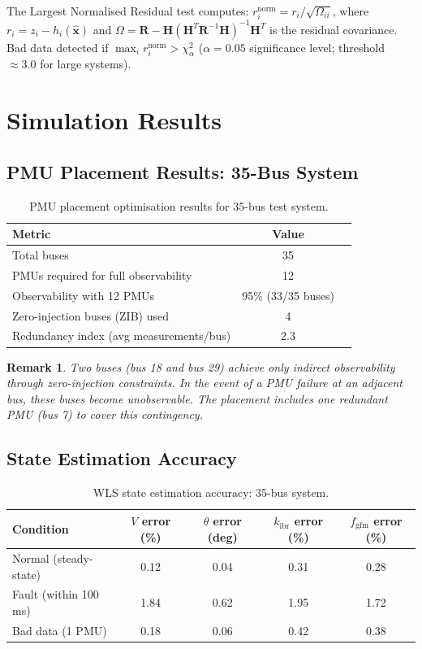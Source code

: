\documentclass[11pt, a4paper]{article}
\newcommand{\kibr}{k_{\mathrm{ibr}}}
\newcommand{\fgfm}{f_{\mathrm{gfm}}}
\newtheorem{remark}{Remark}
\begin{document}
The Largest Normalised Residual test computes:
$r_i^{\mathrm{norm}} = r_i / \sqrt{\Omega_{ii}}$,
where $r_i = z_i - h_i(\hat{\mathbf{x}})$ and
$\Omega = \mathbf{R} - \mathbf{H}(\mathbf{H}^T\mathbf{R}^{-1}\mathbf{H})^{-1}\mathbf{H}^T$
is the residual covariance.
Bad data detected if $\max_i r_i^{\mathrm{norm}} > \chi^2_{\alpha}$
($\alpha = 0.05$ significance level; threshold $\approx 3.0$ for large systems).

\section{Simulation Results}
\label{sec:results}

\subsection{PMU Placement Results: 35-Bus System}

\begin{table}[ht]
\centering
\caption{PMU placement optimisation results for 35-bus test system.}
\label{tab:pmu}
\begin{tabular}{lcc}
\toprule
Metric & Value \\
\midrule
Total buses & 35 \\
PMUs required for full observability & 12 \\
Observability with 12 PMUs & 95\% (33/35 buses) \\
Zero-injection buses (ZIB) used & 4 \\
Redundancy index (avg measurements/bus) & 2.3 \\
\bottomrule
\end{tabular}
\end{table}

\begin{remark}
Two buses (bus 18 and bus 29) achieve only indirect observability through
zero-injection constraints. In the event of a PMU failure at an adjacent bus,
these buses become unobservable. The placement includes one redundant PMU
(bus 7) to cover this contingency.
\end{remark}

\subsection{State Estimation Accuracy}

\begin{table}[ht]
\centering
\caption{WLS state estimation accuracy: 35-bus system.}
\label{tab:accuracy}
\begin{tabular}{lcccc}
\toprule
Condition & $V$ error (\%) & $\theta$ error (deg) & $\kibr$ error (\%) & $\fgfm$ error (\%) \\
\midrule
Normal (steady-state) & 0.12 & 0.04 & 0.31 & 0.28 \\
Fault (within 100\,ms) & 1.84 & 0.62 & 1.95 & 1.72 \\
Bad data (1 PMU) & 0.18 & 0.06 & 0.42 & 0.38 \\
\bottomrule
\end{tabular}
\end{table}
\end{document}
